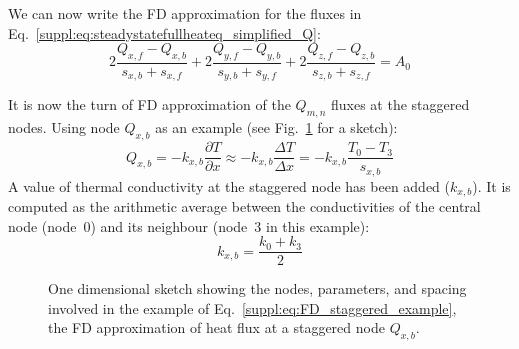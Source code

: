 We can now write the FD approximation for the fluxes in Eq.~\ref{suppl:eq:steadystatefullheateq_simplified_Q}:
\begin{equation}
    \label{suppl:eq:FD_fluxes}
    2 \frac{Q_{x,f} - Q_{x,b}}{s_{x,b} + s_{x,f}} +
    2 \frac{Q_{y,f} - Q_{y,b}}{s_{y,b} + s_{y,f}} +
    2 \frac{Q_{z,f} - Q_{z,b}}{s_{z,b} + s_{z,f}} = A_0
\end{equation}

It is now the turn of FD approximation of the $Q_{m,n}$ fluxes at the staggered nodes.
Using node $Q_{x,b}$ as an example (see Fig.~\ref{suppl:fig:stencil_sketch_flux} for a sketch):
\begin{equation}
    \label{suppl:eq:FD_staggered_example}
    Q_{x,b} =
    -k_{x,b} \frac{\partial T}{\partial x} \approx
    -k_{x,b} \frac{\Delta T}{\Delta x} =
    -k_{x,b} \frac{T_0 - T_3}{s_{x,b}}
\end{equation}
A value of thermal conductivity at the staggered node has been added ($k_{x,b}$).
It is computed as the arithmetic average between the conductivities of the central node (node~$0$) and its neighbour (node~$3$ in this example):
\begin{equation}
    \label{suppl:eq:FD_staggered_example_conductivity}
    k_{x,b} = \frac{k_0 + k_3}{2}
\end{equation}

\begin{figure}[hb] %
    \begin{adjustbox}{center}
    \end{adjustbox}
    \caption[Conservative finite differences: sketch for the staggered node example.]{One dimensional sketch showing the nodes, parameters, and spacing involved in the example of Eq.~\ref{suppl:eq:FD_staggered_example}, the FD approximation of heat flux at a staggered node $Q_{x,b}$.}
    \label{suppl:fig:stencil_sketch_flux}
\end{figure}

